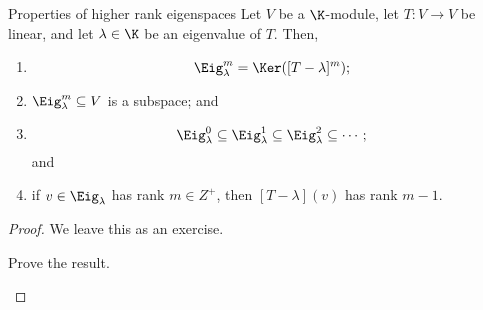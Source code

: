 \begin{prp}{Properties of higher rank eigenspaces}{}
	Let $V$ be a $\K$-module, let $T\colon V\rightarrow V$ be linear, and let $\lambda \in \K$ be an eigenvalue of $T$.  Then,
	\begin{enumerate}
		\item
		\begin{equation}
			\Eig _{\lambda}^m=\Ker ([T-\lambda ]^m);
		\end{equation}
		\item $\Eig _{\lambda}^m\subseteq V$ is a subspace; and
		\item
		\begin{equation}
			\Eig _{\lambda}^0\subseteq \Eig _{\lambda}^1\subseteq \Eig _{\lambda}^2\subseteq \cdots ;
		\end{equation}
		and
		\item if $v\in \Eig _{\lambda}$ has rank $m\in Z^+$, then $[T-\lambda ](v)$ has rank $m-1$.
	\end{enumerate}
	\begin{proof}
		We leave this as an exercise.
		\begin{exr}[breakable=false]{}{}
			Prove the result.
		\end{exr}
	\end{proof}
\end{prp}

